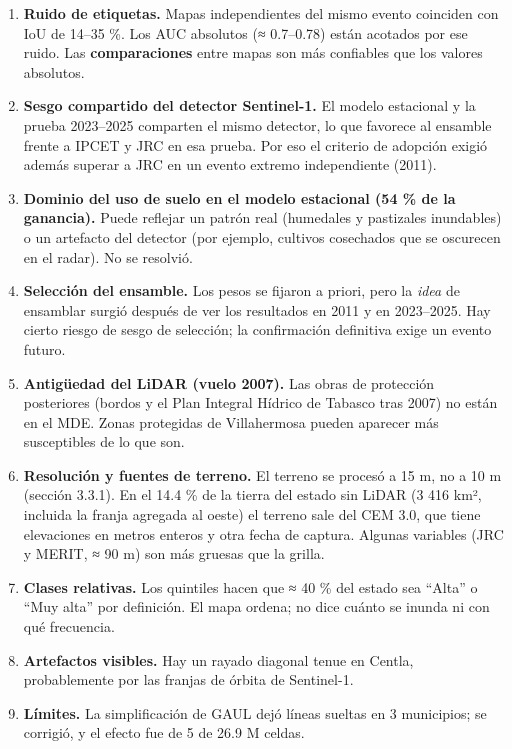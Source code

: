 \begin{enumerate}
\def\labelenumi{\arabic{enumi}.}
\tightlist
\item
  \textbf{Ruido de etiquetas.} Mapas independientes del mismo evento coinciden con IoU de 14--35 \%. Los AUC absolutos (≈ 0.7--0.78) están acotados por ese ruido. Las \textbf{comparaciones} entre mapas son más confiables que los valores absolutos.
\item
  \textbf{Sesgo compartido del detector Sentinel-1.} El modelo estacional y la prueba 2023--2025 comparten el mismo detector, lo que favorece al ensamble frente a IPCET y JRC en esa prueba. Por eso el criterio de adopción exigió además superar a JRC en un evento extremo independiente (2011).
\item
  \textbf{Dominio del uso de suelo en el modelo estacional (54 \% de la ganancia).} Puede reflejar un patrón real (humedales y pastizales inundables) o un artefacto del detector (por ejemplo, cultivos cosechados que se oscurecen en el radar). No se resolvió.
\item
  \textbf{Selección del ensamble.} Los pesos se fijaron a priori, pero la \emph{idea} de ensamblar surgió después de ver los resultados en 2011 y en 2023--2025. Hay cierto riesgo de sesgo de selección; la confirmación definitiva exige un evento futuro.
\item
  \textbf{Antigüedad del LiDAR (vuelo 2007).} Las obras de protección posteriores (bordos y el Plan Integral Hídrico de Tabasco tras 2007) no están en el MDE. Zonas protegidas de Villahermosa pueden aparecer más susceptibles de lo que son.
\item
  \textbf{Resolución y fuentes de terreno.} El terreno se procesó a 15 m, no a 10 m (sección 3.3.1). En el 14.4 \% de la tierra del estado sin LiDAR (3 416 km², incluida la franja agregada al oeste) el terreno sale del CEM 3.0, que tiene elevaciones en metros enteros y otra fecha de captura. Algunas variables (JRC y MERIT, ≈ 90 m) son más gruesas que la grilla.
\item
  \textbf{Clases relativas.} Los quintiles hacen que ≈ 40 \% del estado sea ``Alta'' o ``Muy alta'' por definición. El mapa ordena; no dice cuánto se inunda ni con qué frecuencia.
\item
  \textbf{Artefactos visibles.} Hay un rayado diagonal tenue en Centla, probablemente por las franjas de órbita de Sentinel-1.
\item
  \textbf{Límites.} La simplificación de GAUL dejó líneas sueltas en 3 municipios; se corrigió, y el efecto fue de 5 de 26.9 M celdas.
\end{enumerate}

